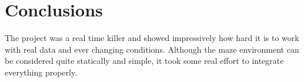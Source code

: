 \section{Conclusions}

The project was a real time killer and showed impressively how hard it is to work with real data and ever changing conditions.
Although the maze environment can be considered quite statically and simple, it took some real effort to integrate everything properly.


